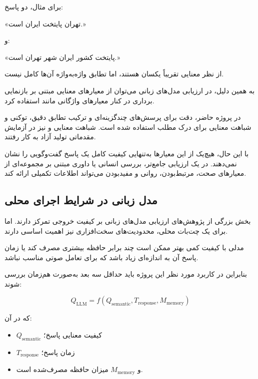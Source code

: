 برای مثال، دو پاسخ:

\begin{center}
«تهران پایتخت ایران است.»
\end{center}

و:

\begin{center}
«پایتخت کشور ایران شهر تهران است.»
\end{center}

از نظر معنایی تقریباً یکسان هستند، اما تطابق واژه‌به‌واژه آن‌ها
کامل نیست.

به همین دلیل، در ارزیابی مدل‌های زبانی می‌توان از معیارهای
معنایی مبتنی بر بازنمایی برداری
در کنار معیارهای واژگانی مانند
استفاده کرد.

در پروژه حاضر، دقت برای پرسش‌های چندگزینه‌ای و ترکیب تطابق دقیق،
 توکنی و شباهت معنایی برای درک مطلب استفاده شده است.
شباهت معنایی و  نیز در آزمایش مقدماتی تولید آزاد
به کار رفتند.

با این حال، هیچ‌یک از این معیارها به‌تنهایی کیفیت کامل یک
پاسخ گفت‌وگویی را نشان نمی‌دهند.
در یک ارزیابی جامع‌تر، بررسی انسانی یا داوری مبتنی بر مجموعه‌ای
از معیارهای صحت، مرتبط‌بودن، روانی و مفیدبودن می‌تواند
اطلاعات تکمیلی ارائه کند.


\subsection{مدل زبانی در شرایط اجرای محلی}

بخش بزرگی از پژوهش‌های ارزیابی مدل‌های زبانی بر کیفیت خروجی
تمرکز دارند.
اما برای یک چت‌بات محلی، محدودیت‌های سخت‌افزاری نیز اهمیت
اساسی دارند.

مدلی با کیفیت کمی بهتر ممکن است چند برابر حافظه بیشتری
مصرف کند یا زمان پاسخ آن به اندازه‌ای زیاد باشد که برای
تعامل صوتی مناسب نباشد.

بنابراین در کاربرد مورد نظر این پروژه باید حداقل سه بعد
به‌صورت هم‌زمان بررسی شوند:

\begin{equation}
Q_{\mathrm{LLM}}
=
f(
Q_{\mathrm{semantic}},
T_{\mathrm{response}},
M_{\mathrm{memory}}
)
\end{equation}

که در آن:

\begin{itemize}

    \item $Q_{\mathrm{semantic}}$ کیفیت معنایی پاسخ؛
    \item $T_{\mathrm{response}}$ زمان پاسخ؛
    \item و $M_{\mathrm{memory}}$ میزان حافظه مصرف‌شده است.
\end{itemize}

